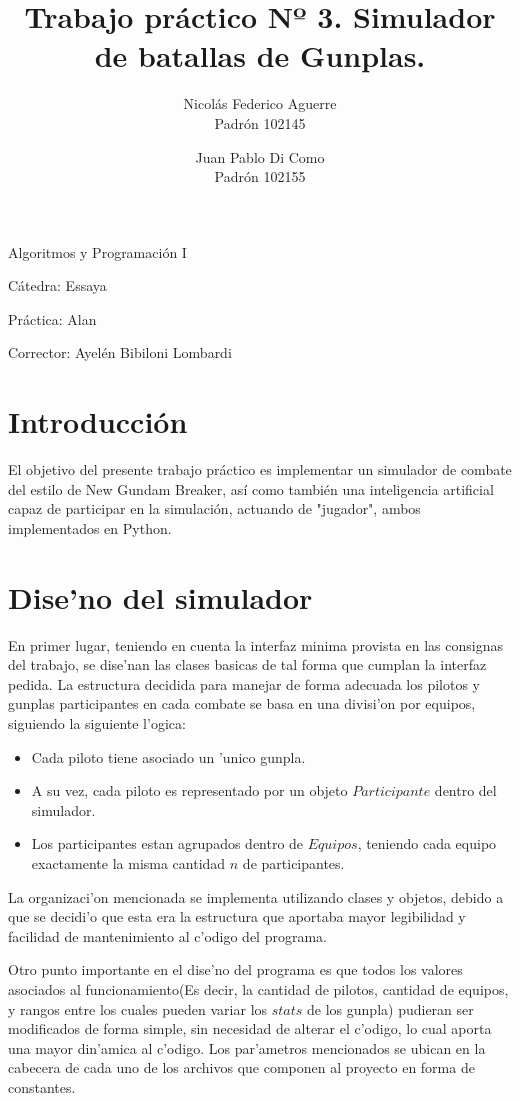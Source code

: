 \documentclass[12pt]{article}
\title{Trabajo pr\'actico Nº 3. Simulador de batallas de Gunplas.}
\author{Nicol\'as Federico Aguerre\\Padr\'on 102145
		\and
		Juan Pablo Di Como\\Padr\'on 102155}
\begin{document}

	\maketitle

	Algoritmos y Programaci\'on I

	C\'atedra: Essaya 


	Pr\'actica: Alan

	Corrector: Ayel\'en Bibiloni Lombardi

	\section{Introducci\'on}
		El objetivo del presente trabajo pr\'actico es implementar un simulador de combate del estilo de New Gundam Breaker, as\'i como 
		tambi\'en una inteligencia artificial capaz de participar en la simulaci\'on, actuando de "jugador", ambos implementados en Python.

	\section{Dise'no del simulador}
		En primer lugar, teniendo en cuenta la interfaz minima provista en las consignas del trabajo, se dise'nan las clases basicas de tal forma que cumplan la interfaz pedida.
		La estructura decidida para manejar de forma adecuada los pilotos y gunplas participantes en cada combate se basa en una divisi'on por equipos, siguiendo la siguiente l'ogica:

		\begin{itemize}
			\item Cada piloto tiene asociado un 'unico gunpla. 
			\item A su vez, cada piloto es representado por un objeto $Participante$ dentro del simulador.
			\item Los participantes estan agrupados dentro de $Equipos$, teniendo cada equipo exactamente la misma 
			cantidad $n$ de participantes.
		\end{itemize}

		La organizaci'on mencionada se implementa utilizando clases y objetos, debido a que se decidi'o que esta era la estructura 
		que aportaba mayor legibilidad y facilidad de mantenimiento al c'odigo del programa.\\
		\par
		Otro punto importante en el dise'no del programa es que todos los valores asociados al funcionamiento(Es decir, la cantidad de pilotos, cantidad de equipos, y rangos entre los cuales pueden variar los $stats$ de los gunpla) pudieran ser modificados
		de forma simple, sin necesidad de alterar el c'odigo, lo cual aporta una mayor din'amica al c'odigo. Los par'ametros mencionados 
		se ubican en la cabecera de cada uno de los archivos que componen al proyecto en forma de constantes.\\
		\par
\end{document}
